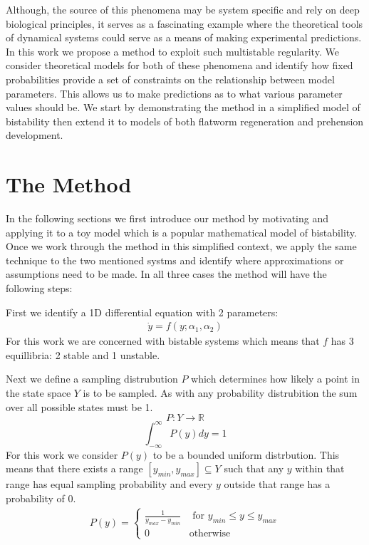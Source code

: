 \documentclass[letterpaper]{article}
\begin{document}
Although, the source of this phenomena may be system specific and rely on deep
biological principles, it serves as a fascinating example where the theoretical 
tools of dynamical systems could serve as a means of making experimental predictions.
In this work we propose a method to exploit such multistable regularity. We consider
theoretical models for both of these phenomena and identify how fixed 
probabilities provide a set of constraints on the relationship between model
parameters. This allows us to make predictions as to what various parameter 
values should be. We start by demonstrating the method in a simplified model
of bistability  then extend it to models of both flatworm regeneration and
prehension development.

\section{The Method}
In the following sections we first introduce our method by motivating
and applying it to a toy model which is a popular mathematical model
of bistability. Once we work through the method in this simplified 
context, we apply the same technique to the two mentioned systms and 
identify where approximations or assumptions need to be made.
In all three cases the method will have the following steps:

First we identify a 1D differential equation with 2 parameters: 
\begin{eqnarray}
  \label{ydot}
  \dot{y} = f(y; \alpha_1, \alpha_2)
\end{eqnarray}
For this work we are concerned with bistable systems which means that $f$
has 3 equillibria: 2 stable and 1 unstable.

Next we define a sampling distrubution $P$ which determines how likely a 
point in the state space $Y$ is to be sampled. As with any probability distrubition
the sum over all possible states must be 1.
\[
  P:Y\rightarrow \mathbb{R}
  \]
\[
  \int_{-\infty}^{\infty}P(y)dy = 1
\]
For this work we consider $P(y)$ to be a bounded uniform distrbution.
This means that there exists a range $[y_{min},y_{max}]\subseteq Y$ 
such that any $y$ 
within that range has equal sampling probability and every $y$ outside
that range has a probability of $0$.
\begin{eqnarray}
  \label{bound_uniform}
    P(y) = \begin{cases}
        \frac{1}{y_{max} - y_{min}} & \text{ for } y_{min}\leq y\leq y_{max}\\
        0 & \text{otherwise}
    \end{cases}
\end{eqnarray}
\end{document}
